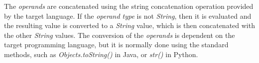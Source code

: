 The \emph{operands} are concatenated using the string concatenation operation
provided by the target language.
If the \emph{operand type} is not \emph{String},
then it is evaluated and the resulting value is converted to a \emph{String} value,
which is then concatenated with the other \emph{String} values.
The conversion of the \emph{operands} is dependent on the target programming language,
but it is normally done using the standard methods,
such as \emph{Objects.toString()} in Java, or \emph{str()} in Python.
